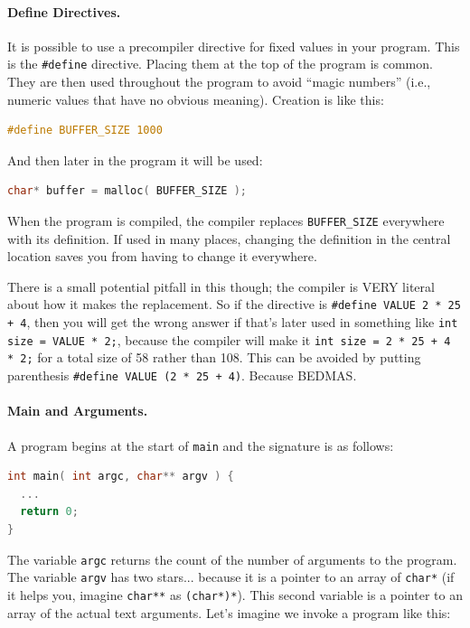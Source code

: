 \documentclass[a4paper]{report}
\begin{document}
\paragraph{Define Directives.}

It is possible to use a precompiler directive for fixed values in your program. This is the \texttt{\#define} directive. Placing them at the top of the program is common. They are then used throughout the program to avoid ``magic numbers'' (i.e., numeric values that have no obvious meaning). Creation is like this:

\begin{lstlisting}[language=C]
#define BUFFER_SIZE 1000
\end{lstlisting}

And then later in the program it will be used:

\begin{lstlisting}[language=C]
char* buffer = malloc( BUFFER_SIZE );
\end{lstlisting}

When the program is compiled, the compiler replaces \texttt{BUFFER\_SIZE} everywhere with its definition. If used in many places, changing the definition in the central location saves you from having to change it everywhere.

There is a small potential pitfall in this though; the compiler is VERY literal about how it makes the replacement. So if the directive is \texttt{\#define VALUE 2 * 25 + 4}, then you will get the wrong answer if that's later used in something like \texttt{int size = VALUE * 2;}, because the compiler will make it \texttt{int size = 2 * 25 + 4 * 2;} for a total size of 58 rather than 108. This can be avoided by putting parenthesis \texttt{\#define VALUE (2 * 25 + 4)}. Because BEDMAS.

\paragraph{Main and Arguments.}
A program begins at the start of \texttt{main} and the signature is as follows:

\begin{lstlisting}[language=C]
int main( int argc, char** argv ) {
  ...
  return 0;
}
\end{lstlisting}

The variable \texttt{argc} returns the count of the number of arguments to the program. The variable \texttt{argv} has two stars... because it is a pointer to an array of \texttt{char*} (if it helps you, imagine \texttt{char**} as \texttt{(char*)*}). This second variable is a pointer to an array of the actual text arguments. Let's imagine we invoke a program like this:
\end{document}

